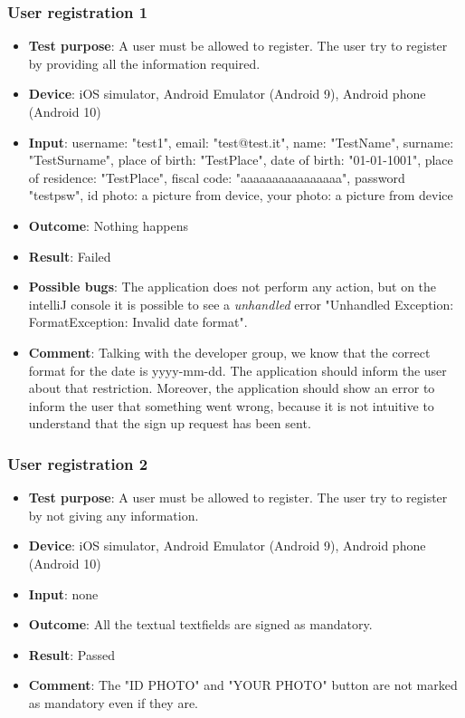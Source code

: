 \documentclass[../ATD.tex]{subfiles}
\begin{document}
    \subsubsection{User registration 1}\label{subsubsec:user-registration-1}
    \begin{itemize}
        \item \textbf{Test purpose}: A user must be allowed to register.
        The user try to register by providing all the information required.
        \item \textbf{Device}: iOS simulator, Android Emulator (Android 9), Android phone (Android 10)
        \item \textbf{Input}: username: "test1", email: "test@test.it", name: "TestName", surname: "TestSurname", place of birth: "TestPlace", date of birth: "01-01-1001", place of residence: "TestPlace", fiscal code: "aaaaaaaaaaaaaaaa", password "testpsw", id photo: a picture from device, your photo: a picture from device
        \item \textbf{Outcome}: Nothing happens
        \item \textbf{Result}: Failed
        \item \textbf{Possible bugs}: The application does not perform any action, but on the intelliJ console it is possible to see a \textit{unhandled} error "Unhandled Exception: FormatException: Invalid date format".
        \item \textbf{Comment}: Talking with the developer group, we know that the correct format for the date is yyyy-mm-dd.
        The application should inform the user about that restriction.
        Moreover, the application should show an error to inform the user that something went wrong, because it is not intuitive to understand that the sign up request has been sent.
    \end{itemize}

    \subsubsection{User registration 2}\label{subsubsec:user-registration-2}
    \begin{itemize}
        \item \textbf{Test purpose}: A user must be allowed to register.
        The user try to register by not giving any information.
        \item \textbf{Device}: iOS simulator, Android Emulator (Android 9), Android phone (Android 10)
        \item \textbf{Input}: none
        \item \textbf{Outcome}: All the textual textfields are signed as mandatory.
        \item \textbf{Result}: Passed
        \item \textbf{Comment}: The "ID PHOTO" and "YOUR PHOTO" button are not marked as mandatory even if they are.
    \end{itemize}
\end{document}
